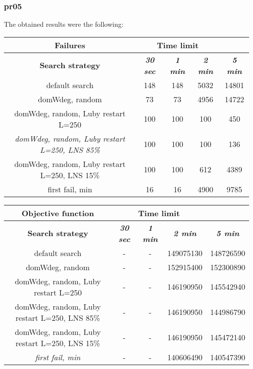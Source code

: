 \subsubsection{pr05}
The obtained results were the following:
{
\renewcommand{\arraystretch}{2}
\begin{longtable}[h]{| c | c | c | c | c |}
    \hline
    \textbf{Failures} & \multicolumn{3}{c}{Time limit} & \\
    \hline
    \textbf{Search strategy} & \textbf{\textit{30 sec}} & \textbf{\textit{1 min}} & \textbf{\textit{2 min}} & \textbf{\textit{5 min}} \\
    \hline
    \endhead
    default search                                         & 148 &  148 &  5032 &  14801 \\
    \hline
    domWdeg, random                                        &  73 &   73 &  4956 &  14722 \\
    \hline
    domWdeg, random, Luby restart L=250                    & 100 &  100 &   100 &    450 \\
    \hline
    \textit{domWdeg, random, Luby restart L=250, LNS 85\%} & 100 &  100 &   100 &    136 \\
    \hline
    domWdeg, random, Luby restart L=250, LNS 15\%          & 100 &  100 &   612 &   4389 \\
    \hline
    first fail, min                                        &  16 &   16 &  4900 &   9785 \\
    \hline
\end{longtable}
}

{
\renewcommand{\arraystretch}{2}
\begin{longtable}[h]{| c | c | c | c | c |}
    \hline
    \textbf{Objective function} & \multicolumn{3}{c}{Time limit} & \\
    \hline
    \textbf{Search strategy} & \textbf{\textit{30 sec}} & \textbf{\textit{1 min}} & \textbf{\textit{2 min}} & \textbf{\textit{5 min}} \\
    \hline
    \endhead
    default search                                        & - & - & 149075130 & 148726590 \\
    \hline
    domWdeg, random                                       & - & - & 152915400 & 152300890 \\
    \hline
    domWdeg, random, Luby restart L=250                   & - & - & 146190950 & 145542940 \\
    \hline
    domWdeg, random, Luby restart L=250, LNS 85\%         & - & - & 146190950 & 144986790 \\
    \hline
    domWdeg, random, Luby restart L=250, LNS 15\%         & - & - & 146190950 & 145472140 \\
    \hline
    \textit{first fail, min}                              & - & - & 140606490 & 140547390 \\
    \hline
\end{longtable}
}